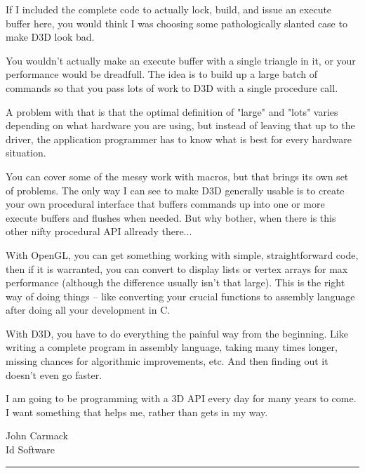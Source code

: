 \begin{allintypewriter}
\par
If I included the complete code to actually lock, build, and issue an execute buffer here, you would think I 
was choosing some pathologically slanted case to make D3D look bad.\\ 
\par
You wouldn't actually make an execute buffer with a single triangle in it, or your performance would be 
dreadfull. The idea is to build up a large batch of commands so that you pass lots of work to D3D with a single 
procedure call.\\ 
\par
A problem with that is that the optimal definition of "large" and "lots" varies depending on what hardware you 
are using, but instead of leaving that up to the driver, the application programmer has to know what is best 
for every hardware situation.\\ 
\par
You can cover some of the messy work with macros, but that brings its own set of problems. The only way I can 
see to make D3D generally usable is to create your own procedural interface that buffers commands up into one 
or more execute buffers and flushes when needed. But why bother, when there is this other nifty procedural API 
allready there...\\ 
\par
With OpenGL, you can get something working with simple, straightforward code, then if it is warranted, you can 
convert to display lists or vertex arrays for max performance (although the difference usually isn't that large). 
This is the right way of doing things -- like converting your crucial functions to assembly language after doing 
all your development in C.\\ 
\par
With D3D, you have to do everything the painful way from the beginning. Like writing a complete program in 
assembly language, taking many times longer, missing chances for algorithmic improvements, etc. And then finding 
out it doesn't even go faster.\\ 
\par
I am going to be programming with a 3D API every day for many years to come. I want something that helps me, 
rather than gets in my way.\\ 
\par
John Carmack\\ 
Id Software\\ 
\par
\end{allintypewriter}
\par \hrule